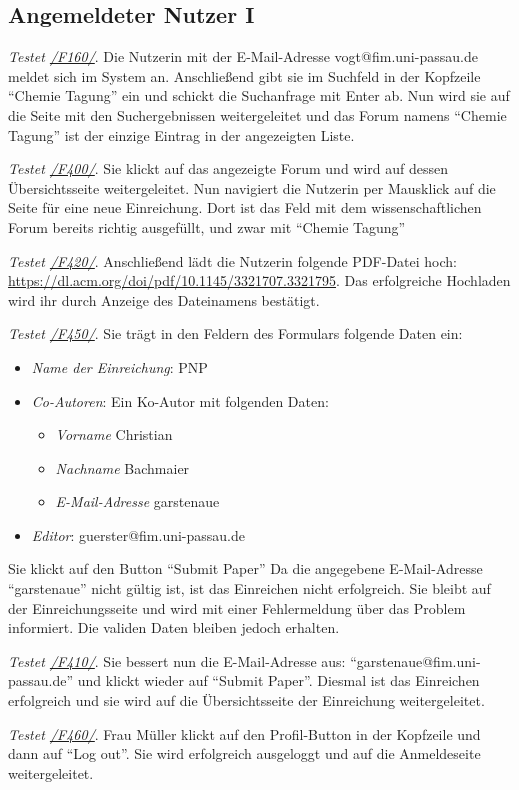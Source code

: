 \subsection{Angemeldeter Nutzer I}
\begin{description}

	 \emph{Testet \hyperref[funkt:160]{/F160/}}.
	Die Nutzerin mit der E-Mail-Adresse vogt@fim.uni-passau.de meldet sich im System an.
	Anschließend gibt sie im Suchfeld in der Kopfzeile ``Chemie Tagung'' ein und schickt die Suchanfrage mit Enter ab.
	Nun wird sie auf die Seite mit den Suchergebnissen weitergeleitet und das Forum namens ``Chemie Tagung'' ist der einzige Eintrag in der angezeigten Liste.

	 \emph{Testet \hyperref[funkt:400]{/F400/}}.
	Sie klickt auf das angezeigte Forum und wird auf dessen Übersichtsseite weitergeleitet.
	Nun navigiert die Nutzerin per Mausklick auf die Seite für eine neue Einreichung.
	Dort ist das Feld mit dem wissenschaftlichen Forum bereits richtig ausgefüllt, und zwar mit ``Chemie Tagung''

	 \emph{Testet \hyperref[funkt:420]{/F420/}}.
	Anschließend lädt die Nutzerin folgende PDF-Datei hoch: \href{https://dl.acm.org/doi/pdf/10.1145/3321707.3321795}{https://dl.acm.org/doi/pdf/10.1145/3321707.3321795}.
	Das erfolgreiche Hochladen wird ihr durch Anzeige des Dateinamens bestätigt.

	 \emph{Testet \hyperref[funkt:450]{/F450/}}.
	Sie trägt in den Feldern des Formulars folgende Daten ein:
	\begin{itemize}
		\item \emph{Name der Einreichung}: P\neq NP
		\item \emph{Co-Autoren}: Ein Ko-Autor mit folgenden Daten:
		\begin{itemize}
			\item \emph{Vorname} Christian
			\item \emph{Nachname} Bachmaier
			\item \emph{E-Mail-Adresse} garstenaue
		\end{itemize}
		\item \emph{Editor}: guerster@fim.uni-passau.de
	\end{itemize}
	Sie klickt auf den Button ``Submit Paper''
	Da die angegebene E-Mail-Adresse ``garstenaue'' nicht gültig ist, ist das Einreichen nicht erfolgreich.
	Sie bleibt auf der Einreichungsseite und wird mit einer Fehlermeldung über das Problem informiert.
	Die validen Daten bleiben jedoch erhalten.

	 \emph{Testet \hyperref[funkt:410]{/F410/}}.
	Sie bessert nun die E-Mail-Adresse aus: ``garstenaue@fim.uni-passau.de'' und klickt wieder auf ``Submit Paper''.
	Diesmal ist das Einreichen erfolgreich und sie wird auf die Übersichtsseite der Einreichung weitergeleitet.

	 \emph{Testet \hyperref[funkt:460]{/F460/}}.
	Frau Müller klickt auf den Profil-Button in der Kopfzeile und dann auf ``Log out''.
	Sie wird erfolgreich ausgeloggt und auf die Anmeldeseite weitergeleitet.
\end{description}

